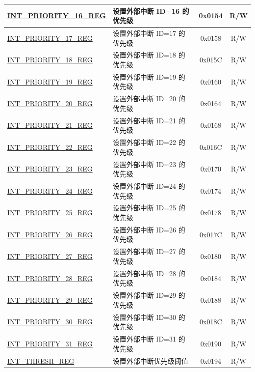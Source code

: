 \begin{longtable}{ | p{4.0cm} | p{8.4cm} | c | c| }
\hyperref[regdesc:INTPRIORITYREG]{INT\_PRIORITY\_16\_REG} & 设置外部中断 ID=16 的优先级 & 0x0154 & R/W \\\hline
\hyperref[regdesc:INTPRIORITYREG]{INT\_PRIORITY\_17\_REG} & 设置外部中断 ID=17 的优先级 & 0x0158 & R/W \\\hline
\hyperref[regdesc:INTPRIORITYREG]{INT\_PRIORITY\_18\_REG} & 设置外部中断 ID=18 的优先级 & 0x015C & R/W \\\hline
\hyperref[regdesc:INTPRIORITYREG]{INT\_PRIORITY\_19\_REG} & 设置外部中断 ID=19 的优先级 & 0x0160 & R/W \\\hline
\hyperref[regdesc:INTPRIORITYREG]{INT\_PRIORITY\_20\_REG} & 设置外部中断 ID=20 的优先级 & 0x0164 & R/W \\\hline
\hyperref[regdesc:INTPRIORITYREG]{INT\_PRIORITY\_21\_REG} & 设置外部中断 ID=21 的优先级 & 0x0168 & R/W \\\hline
\hyperref[regdesc:INTPRIORITYREG]{INT\_PRIORITY\_22\_REG} & 设置外部中断 ID=22 的优先级 & 0x016C & R/W \\\hline
\hyperref[regdesc:INTPRIORITYREG]{INT\_PRIORITY\_23\_REG} & 设置外部中断 ID=23 的优先级 & 0x0170 & R/W \\\hline
\hyperref[regdesc:INTPRIORITYREG]{INT\_PRIORITY\_24\_REG} & 设置外部中断 ID=24 的优先级 & 0x0174 & R/W \\\hline
\hyperref[regdesc:INTPRIORITYREG]{INT\_PRIORITY\_25\_REG} & 设置外部中断 ID=25 的优先级 & 0x0178 & R/W \\\hline
\hyperref[regdesc:INTPRIORITYREG]{INT\_PRIORITY\_26\_REG} & 设置外部中断 ID=26 的优先级 & 0x017C & R/W \\\hline
\hyperref[regdesc:INTPRIORITYREG]{INT\_PRIORITY\_27\_REG} & 设置外部中断 ID=27 的优先级 & 0x0180 & R/W \\\hline
\hyperref[regdesc:INTPRIORITYREG]{INT\_PRIORITY\_28\_REG} & 设置外部中断 ID=28 的优先级 & 0x0184 & R/W \\\hline
\hyperref[regdesc:INTPRIORITYREG]{INT\_PRIORITY\_29\_REG} & 设置外部中断 ID=29 的优先级 & 0x0188 & R/W \\\hline
\hyperref[regdesc:INTPRIORITYREG]{INT\_PRIORITY\_30\_REG} & 设置外部中断 ID=30 的优先级 & 0x018C & R/W \\\hline
\hyperref[regdesc:INTPRIORITYREG]{INT\_PRIORITY\_31\_REG} & 设置外部中断 ID=31 的优先级 & 0x0190 & R/W \\\hline
\hyperref[regdesc:INTTHRESHREG]{INT\_THRESH\_REG} & 设置外部中断优先级阈值 & 0x0194 & R/W \\\hline
\end{longtable}
